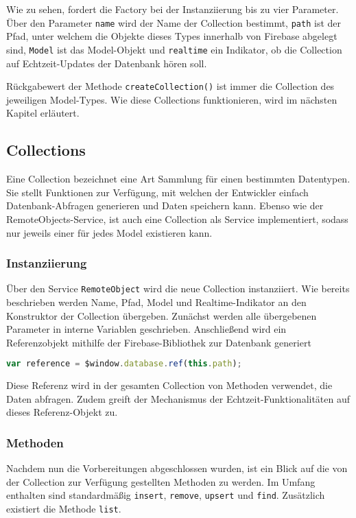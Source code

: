 Wie zu sehen, fordert die Factory bei der Instanziierung bis zu vier Parameter. Über den Parameter \texttt{name} wird der Name der Collection bestimmt, \texttt{path} ist der Pfad,
unter welchem die Objekte dieses Types innerhalb von Firebase abgelegt sind, \texttt{Model} ist das Model-Objekt und \texttt{realtime} ein Indikator,
ob die Collection auf Echtzeit-Updates der Datenbank hören soll.

Rückgabewert der Methode \texttt{createCollection()} ist immer die Collection des jeweiligen Model-Types.
Wie diese Collections funktionieren, wird im nächsten Kapitel erläutert.

\subsection{Collections}

Eine Collection bezeichnet eine Art Sammlung für einen bestimmten Datentypen. Sie stellt Funktionen zur Verfügung, mit welchen der Entwickler einfach Datenbank-Abfragen generieren und Daten speichern kann.
Ebenso wie der RemoteObjects-Service, ist auch eine Collection als Service implementiert, sodass nur jeweils einer für jedes Model existieren kann.

\subsubsection{Instanziierung}
Über den Service \texttt{RemoteObject} wird die neue Collection instanziiert. Wie bereits beschrieben werden Name, Pfad, Model und Realtime-Indikator an den Konstruktor der Collection übergeben.
Zunächst werden alle übergebenen Parameter in interne Variablen geschrieben.
Anschließend wird ein Referenzobjekt mithilfe der Firebase-Bibliothek zur Datenbank generiert

 \begin{lstlisting}[language=Javascript, label=code_CollectionReference, caption=Befehl zum Generieren einer Firebase-Referenz]
 var reference = $window.database.ref(this.path);
\end{lstlisting}

Diese Referenz wird in der gesamten Collection von Methoden verwendet, die Daten abfragen. Zudem greift der Mechanismus der Echtzeit-Funktionalitäten auf dieses Referenz-Objekt zu.

\subsubsection{Methoden}
Nachdem nun die Vorbereitungen abgeschlossen wurden, ist ein Blick auf die von der Collection zur Verfügung gestellten Methoden zu werden.
Im Umfang enthalten sind standardmäßig \texttt{insert}, \texttt{remove}, \texttt{upsert} und \texttt{find}. Zusätzlich existiert die Methode \texttt{list}.

